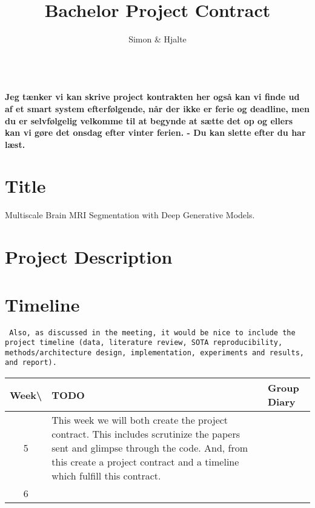 \documentclass[12pt]{report}
\begin{document}
\title{Bachelor Project Contract}
\author{\color{red}Simon \& Hjalte}
\date{}
\maketitle

\ls\\\textbf{Jeg tænker vi kan skrive project kontrakten her også kan vi finde ud af et smart system efterfølgende, når der ikke er ferie og deadline, men du er selvfølgelig velkomme til at begynde at sætte det op og ellers kan vi gøre det onsdag efter vinter ferien. - Du kan slette efter du har læst.}\ls
\section*{Title}
{\Large Multiscale Brain MRI Segmentation with Deep Generative Models.}


\section*{Project Description}







\section{Timeline}
\texttt{
Also, as discussed in the meeting, it would be nice to include the project timeline (data, literature review, SOTA reproducibility, methods/architecture design, implementation, experiments and results, and report).
}
\vspace{1em}

\def\arraystretch{1.2} %
\noindent\begin{tabular}{|c|p{11cm}|p{4cm}|}\hline
Week\textbackslash & TODO & Group Diary \\\hline\hline
5 & This week we will both create the project contract. This includes scrutinize the papers sent and glimpse through the code. And, from this create a project contract and a timeline which fulfill this contract. &  \\\hline
6 &  &  \\\hline
\end{tabular}
\vspace{1em}
\end{document}
